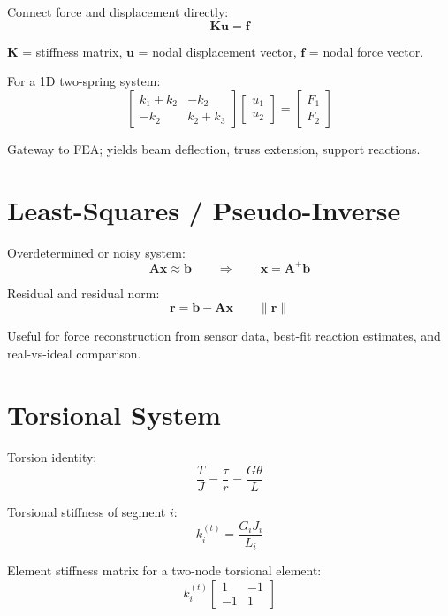 \documentclass[11pt, letterpaper]{article}
\newcommand{\bA}{\mathbf{A}}
\newcommand{\bK}{\mathbf{K}}
\newcommand{\bu}{\mathbf{u}}
\newcommand{\bx}{\mathbf{x}}
\begin{document}
Connect force and displacement directly:
\[
\bK\bu = \mathbf{f}
\]

\noindent
$\bK$ = stiffness matrix, $\bu$ = nodal displacement vector,
$\mathbf{f}$ = nodal force vector.

For a 1D two-spring system:
\[
\begin{bmatrix}
k_1+k_2 & -k_2 \\
-k_2    & k_2+k_3
\end{bmatrix}
\begin{bmatrix} u_1 \\ u_2 \end{bmatrix}
=
\begin{bmatrix} F_1 \\ F_2 \end{bmatrix}
\]

Gateway to FEA; yields beam deflection, truss extension, support reactions.

\section{Least-Squares / Pseudo-Inverse}

Overdetermined or noisy system:
\[
\bA\bx \approx \mathbf{b}
\qquad\Longrightarrow\qquad
\bx = \bA^+\mathbf{b}
\]

Residual and residual norm:
\[
\mathbf{r} = \mathbf{b} - \bA\bx \qquad \|\mathbf{r}\|
\]

Useful for force reconstruction from sensor data, best-fit reaction estimates,
and real-vs-ideal comparison.

\section{Torsional System}

Torsion identity:
\[
\frac{T}{J} = \frac{\tau}{r} = \frac{G\theta}{L}
\]

Torsional stiffness of segment $i$:
\[
k_i^{(t)} = \frac{G_i J_i}{L_i}
\]

Element stiffness matrix for a two-node torsional element:
\[
k_i^{(t)}\begin{bmatrix}1 & -1\\-1 & 1\end{bmatrix}
\]
\end{document}

